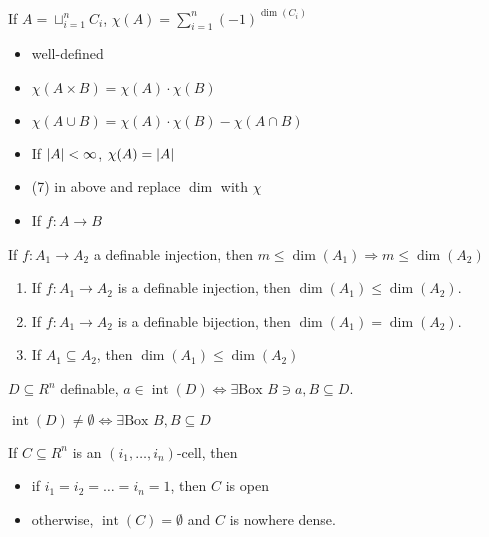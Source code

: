 \documentclass[11pt]{article}
\DeclareMathOperator{\tint}{\text{int}}
\begin{document}
\begin{definition}[]
If \(A=\sqcup_{i=1}^nC_i\), \(\chi(A)=\sum_{i=1}^n(-1)^{\dim(C_i)}\)
\end{definition}

\begin{theorem}[]
\begin{itemize}
\item well-defined
\item \(\chi(A\times B)=\chi(A)\cdot\chi(B)\)
\item \(\chi(A\cup B)=\chi(A)\cdot\chi(B)-\chi(A\cap B)\)
\item If \(\abs{A}<\infty\), \(\chi(A)=\abs{A}\)
\item (7) in above and replace \(\dim\) with \(\chi\)
\item If \(f:A\to B\)
\end{itemize}
\end{theorem}

\begin{lemma}[]
If \(f:A_1\to A_2\) a definable injection, then \(m\le\dim(A_1)\Rightarrow m\le\dim(A_2)\)
\end{lemma}

\begin{theorem}[]
\begin{enumerate}
\item If \(f:A_1\to A_2\) is a definable injection, then \(\dim(A_1)\le\dim(A_2)\).
\item If \(f:A_1\to A_2\) is a definable bijection, then \(\dim(A_1)=\dim(A_2)\).
\item If \(A_1\subseteq A_2\), then \(\dim(A_1)\le\dim(A_2)\)
\end{enumerate}
\end{theorem}

\(D\subseteq R^n\) definable, \(a\in\tint(D)\Leftrightarrow\exists\text{Box } B\ni a, B\subseteq D\).

\(\tint(D)\neq\emptyset\Leftrightarrow\exists\text{Box }B, B\subseteq D\)

\begin{remark}
If \(C\subseteq R^n\) is an \((i_1,\dots,i_n)\)-cell, then
\begin{itemize}
\item if \(i_1=i_2=\dots=i_n=1\), then \(C\) is open
\item otherwise, \(\tint(C)=\emptyset\) and \(C\) is nowhere dense.
\end{itemize}
\end{remark}
\end{document}
